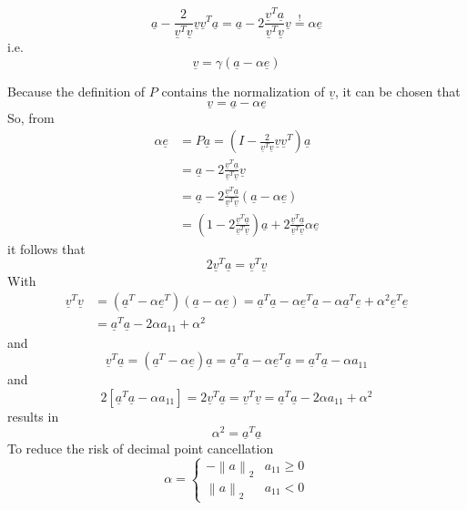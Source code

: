 \documentclass{article}
\newcommand{\norm}[1]{\left\|#1\right\|}
\begin{document}
\[ \underline{a} - \frac{2}{\underline{v}^T \underline{v}} \underline{v} \underline{v}^T \underline{a} = \underline{a} - 2 \frac{\underline{v}^T \underline{a}}{\underline{v}^T \underline{v}} \underline{v} \stackrel{!}{=} \alpha \underline{e} \]
i.e.
\[ \underline{v} = \gamma(\underline{a} - \alpha \underline{e}) \]

Because the definition of $P$ contains the normalization of $\underline{v}$, it can be chosen that
\[ \underline{v} = \underline{a} - \alpha \underline{e} \]
So, from
\begin{align*}
  \alpha \underline{e}
    &= P \underline{a} = \left(I - \frac{2}{\underline{v}^T \underline{v}} \underline{v} \underline{v}^T\right) \underline{a} \\
    &= \underline{a} - 2 \frac{\underline{v}^T \underline{a}}{\underline{v}^T \underline{v}} \underline{v} \\
    &= \underline{a} - 2 \frac{\underline{v}^T \underline{a}}{\underline{v}^T \underline{v}} (\underline{a} - \alpha \underline{e}) \\
    &= \left(1 - 2 \frac{\underline{v}^T \underline{a}}{\underline{v}^T \underline{v}}\right) \underline{a} + 2 \frac{\underline{v}^T \underline{a}}{\underline{v}^T \underline{v}} \alpha \underline{e}
\end{align*}
it follows that
\[ 2 \underline{v}^T \underline{a} = \underline{v}^T \underline{v} \]
With
\begin{align*}
  \underline{v}^T \underline{v}
    &= (\underline{a}^T - \alpha \underline{e}^T) (\underline{a} - \alpha \underline{e}) = \underline{a}^T \underline{a} - \alpha \underline{e}^T \underline{a} - \alpha \underline{a}^T \underline{e} + \alpha^2 \underline{e}^T \underline{e} \\
    &= \underline{a}^T \underline{a} - 2 \alpha a_{11} + \alpha^2
\end{align*}
and
\[ \underline{v}^T \underline{a} = (\underline{a}^T - \alpha \underline{e}) \underline{a} = \underline{a}^T \underline{a} - \alpha \underline{e}^T \underline{a} = \underline{a}^T \underline{a} - \alpha a_{11} \]
and
\[ 2 [\underline{a}^T \underline{a} - \alpha a_{11}] = 2 \underline{v}^T \underline{a} = \underline{v}^T \underline{v} = \underline{a}^T \underline{a} - 2 \alpha a_{11} + \alpha^2 \]
results in
\[ \alpha^2 = \underline{a}^T \underline{a} \]
To reduce the risk of decimal point cancellation
\[
  \alpha = \begin{cases}
    -\norm{a}_2 & a_{11} \geq 0 \\
    \norm{a}_2 & a_{11} < 0
  \end{cases}
\]
\end{document}
